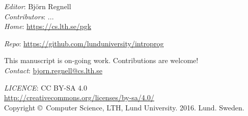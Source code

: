 
\clearpage\null\thispagestyle{empty}
\vfill

{
\setlength{\parindent}{0pt}
\emph{Editor}: Björn Regnell \\ 

\emph{Contributors}: 
 ...
\\

\emph{Home}: \url{https://cs.lth.se/pgk} \\ \newline

\emph{Repo}: \url{https://github.com/lunduniversity/introprog} \\ \newline

This manuscript is on-going work. Contributions are welcome! \\ 
\emph{Contact}: \url{bjorn.regnell@cs.lth.se}
\\ \newline

\emph{LICENCE}: CC BY-SA 4.0 \\
\url{http://creativecommons.org/licenses/by-sa/4.0/}
\\ \newline
Copyright \copyright~Computer Science, LTH, Lund University. 2016. Lund. Sweden.\\
}
